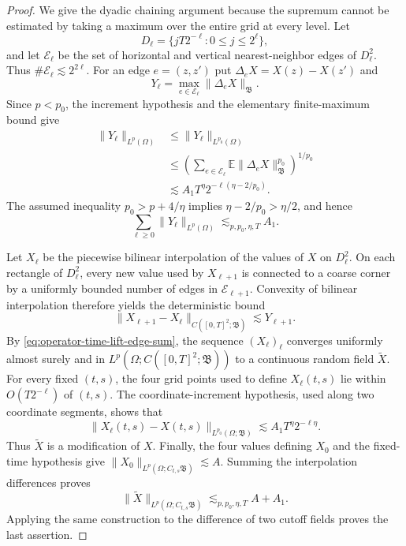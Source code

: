 \documentclass[10pt]{amsart}
\numberwithin{equation}{section}
\theoremstyle{plain}
\theoremstyle{definition}
\theoremstyle{remark}
\newcommand{\E}{\mathbb{E}}
\begin{document}
\begin{proof}
We give the dyadic chaining argument because the supremum cannot be estimated by taking a maximum over the entire grid at every level.  Let
\[
        D_\ell=\{jT2^{-\ell}:0\le j\le2^\ell\},
\]
and let $\mathcal E_\ell$ be the set of horizontal and vertical nearest-neighbor edges of $D_\ell^2$.  Thus
\(
\#\mathcal E_\ell\lesssim 2^{2\ell}
\).
For an edge $e=(z,z')$ put $\Delta_eX=X(z)-X(z')$ and
\[
        Y_\ell=\max_{e\in\mathcal E_\ell}\|\Delta_eX\|_{\mathfrak B}.
\]
Since $p<p_0$, the increment hypothesis and the elementary finite-maximum bound give
\begin{align*}
        \|Y_\ell\|_{L^p(\Omega)}
        &\le \|Y_\ell\|_{L^{p_0}(\Omega)} \\
        &\le
        \left(
        \sum_{e\in\mathcal E_\ell}
        \E\|\Delta_eX\|_{\mathfrak B}^{p_0}
        \right)^{1/p_0} \\
        &\lesssim
        A_1T^\eta
        2^{-\ell(\eta-2/p_0)}.
\end{align*}
The assumed inequality $p_0>p+4/\eta$ implies
\(
\eta-2/p_0>\eta/2
\), and hence
\begin{equation}\label{eq:operator-time-lift-edge-sum}
        \sum_{\ell\ge0}\|Y_\ell\|_{L^p(\Omega)}
        \lesssim_{p,p_0,\eta,T}A_1.
\end{equation}

Let $X_\ell$ be the piecewise bilinear interpolation of the values of $X$ on $D_\ell^2$.  On each rectangle of $D_\ell^2$, every new value used by $X_{\ell+1}$ is connected to a coarse corner by a uniformly bounded number of edges in $\mathcal E_{\ell+1}$.  Convexity of bilinear interpolation therefore yields the deterministic bound
\[
        \|X_{\ell+1}-X_\ell\|_{C([0,T]^2;\mathfrak B)}
        \lesssim Y_{\ell+1}.
\]
By \eqref{eq:operator-time-lift-edge-sum}, the sequence $(X_\ell)_\ell$ converges uniformly almost surely and in
\(L^p(\Omega;C([0,T]^2;\mathfrak B))\)
to a continuous random field $\widetilde X$.  For every fixed $(t,s)$, the four grid points used to define $X_\ell(t,s)$ lie within $O(T2^{-\ell})$ of $(t,s)$.  The coordinate-increment hypothesis, used along two coordinate segments, shows that
\[
        \|X_\ell(t,s)-X(t,s)\|_{L^{p_0}(\Omega;\mathfrak B)}
        \lesssim A_1T^\eta2^{-\ell\eta}.
\]
Thus $\widetilde X$ is a modification of $X$.  Finally, the four values defining $X_0$ and the fixed-time hypothesis give
\(
\|X_0\|_{L^p(\Omega;C_{t,s}\mathfrak B)}\lesssim A
\).
Summing the interpolation differences proves
\[
        \|\widetilde X\|_{L^p(\Omega;C_{t,s}\mathfrak B)}
        \lesssim_{p,p_0,\eta,T}A+A_1.
\]
Applying the same construction to the difference of two cutoff fields proves the last assertion.
\end{proof}
\end{document}
